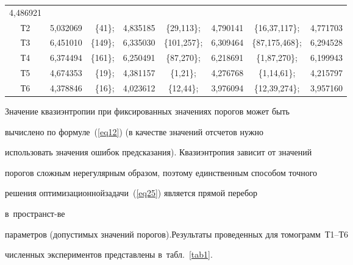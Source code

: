 \begin{multicols}{2}
\begin{table}
\begin{center}
\begin{tabular}{|c|c|rc|cc|cc|}
4,486921 \\


Т2 & 5,032069 & \{41\}; & 4,835185 & \{29,113\}; & 4,790141 & \{16,37,117\}; & 4,771703\\


Т3 & 6,451010 & \{149\}; & 6,335030 & \{101,257\}; & 6,309464 & \{87,175,468\}; & 6,294528 \\


Т4 & 6,374494 & \{161\}; & 6,250491 & \{87,270\}; & 6,218691 & \{1,87,270\}; & 6,199943 \\


Т5 & 4,674353 & \{19\}; & 4,381157 & \{1,21\}; & 4,276768 & \{1,14,61\}; & 4,215797 \\


Т6 & 4,378846 & \{16\}; & 4,023612 & \{12,44\}; & 3,976094 & \{12,39,274\}; & 3,957160 \\

\hline

\end{tabular}

\end{center}

\end{table}





Значение квазиэнтропии при фиксированных значениях порогов может быть 

вычислено по формуле~(\ref{eq12}) (в качестве значений отсчетов нужно 

использовать значения ошибок предсказания). Квази\-энтропия зависит от значений 

порогов сложным нерегулярным образом, поэтому единственным способом точного 

решения оптимизационной\linebreak задачи~(\ref{eq25}) является прямой перебор 

в~пространст-\linebreak ве 

параметров (допустимых значений порогов).\linebreak Результаты проведенных для томограмм~Т1--Т6 

чис\-лен\-ных экспериментов представлены в~табл.~\ref{tab1}. 


\end{multicols}
